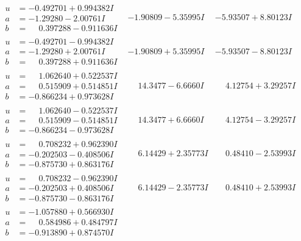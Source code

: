 \documentclass[1p]{elsarticle_modified}
\theoremstyle{definition}
\begin{document}
$$\begin{array}{c|c|c}
\begin{aligned}
u &= -0.492701 + 0.994382 I \\
a &= -1.29280 - 2.00761 I \\
b &= \phantom{-}0.397288 - 0.911636 I\end{aligned}
 & -1.90809 - 5.35995 I & -5.93507 + 8.80123 I \\ \hline\begin{aligned}
u &= -0.492701 - 0.994382 I \\
a &= -1.29280 + 2.00761 I \\
b &= \phantom{-}0.397288 + 0.911636 I\end{aligned}
 & -1.90809 + 5.35995 I & -5.93507 - 8.80123 I \\ \hline\begin{aligned}
u &= \phantom{-}1.062640 + 0.522537 I \\
a &= \phantom{-}0.515909 + 0.514851 I \\
b &= -0.866234 + 0.973628 I\end{aligned}
 & \phantom{-}14.3477 - 6.6660 I & \phantom{-}4.12754 + 3.29257 I \\ \hline\begin{aligned}
u &= \phantom{-}1.062640 - 0.522537 I \\
a &= \phantom{-}0.515909 - 0.514851 I \\
b &= -0.866234 - 0.973628 I\end{aligned}
 & \phantom{-}14.3477 + 6.6660 I & \phantom{-}4.12754 - 3.29257 I \\ \hline\begin{aligned}
u &= \phantom{-}0.708232 + 0.962390 I \\
a &= -0.202503 - 0.408506 I \\
b &= -0.875730 + 0.863176 I\end{aligned}
 & \phantom{-}6.14429 + 2.35773 I & \phantom{-}0.48410 - 2.53993 I \\ \hline\begin{aligned}
u &= \phantom{-}0.708232 - 0.962390 I \\
a &= -0.202503 + 0.408506 I \\
b &= -0.875730 - 0.863176 I\end{aligned}
 & \phantom{-}6.14429 - 2.35773 I & \phantom{-}0.48410 + 2.53993 I \\ \hline\begin{aligned}
u &= -1.057880 + 0.566930 I \\
a &= \phantom{-}0.584986 + 0.484797 I \\
b &= -0.913890 + 0.874570 I\end{aligned}

\end{array}$$
\end{document}
